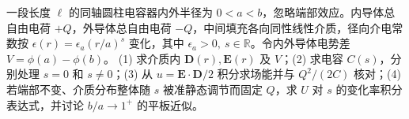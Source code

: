 一段长度 \(\ell\) 的同轴圆柱电容器内外半径为 \(0<a<b\)，忽略端部效应。内导体总自由电荷 \(+Q\)，外导体总自由电荷 \(-Q\)，中间填充各向同性线性介质，径向介电常数按 \(\epsilon(r)=\epsilon_a(r/a)^s\) 变化，其中 \(\epsilon_a>0,\ s\in\mathbb R\)。令内外导体电势差 \(V=\phi(a)-\phi(b)\)。
(1) 求介质内 \(\boldsymbol D(r),\boldsymbol E(r)\) 及 \(V\)；(2) 求电容 \(C(s)\)，分别处理 \(s=0\) 和 \(s\ne0\)；(3) 从 \(u=\boldsymbol E\cdot\boldsymbol D/2\) 积分求场能并与 \(Q^2/(2C)\) 核对；(4) 若端部不变、介质分布整体随 \(s\) 被准静态调节而固定 \(Q\)，求 \(U\) 对 \(s\) 的变化率积分表达式，并讨论 \(b/a\to1^+\) 的平板近似。

